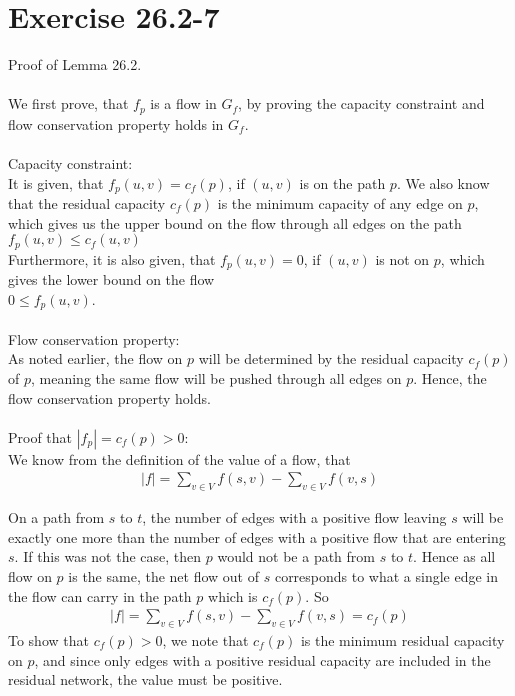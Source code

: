 \section{Exercise 26.2-7}
Proof of Lemma 26.2.
\\
\\
We first prove, that $f_p$ is a flow in $G_f$, by proving the capacity constraint and flow conservation property holds in $G_f$.
\\
\\
Capacity constraint:
\\
It is given, that $f_p(u,v)=c_f(p)$, if $(u,v)$ is on the path $p$. We also know that the residual capacity $c_f(p)$ is the minimum capacity of any edge on $p$, which gives us the upper bound on the flow through all edges on the path
\\
$f_p(u,v)\leq c_f(u,v)$
\\
Furthermore, it is also given, that $f_p(u,v)=0$, if $(u,v)$ is not on $p$, which gives the lower bound on the flow
\\
$0 \leq f_p(u,v)$.
\\
\\
Flow conservation property:
\\
As noted earlier, the flow on $p$ will be determined by the residual capacity $c_f(p)$ of $p$, meaning the same flow will be pushed through all edges on $p$. Hence, the flow conservation property holds.
\\
\\
Proof that $|f_p| = c_f(p)>0$:
\\
We know from the definition of the value of a flow, that 
\begin{align}
|f| = \sum_{v\in V}f(s,v) - \sum_{v\in V}f(v,s)
\end{align}

On a path from $s$ to $t$, the number of edges with a positive flow leaving $s$ will be exactly one more than the number of edges with a positive flow that are entering $s$. If this was not the case, then $p$ would not be a path from $s$ to $t$. Hence as all flow on $p$ is the same, the net flow out of $s$ corresponds to what a single edge in the flow can carry in the path $p$ which is $c_f(p)$. So
\begin{align}
|f| = \sum_{v\in V}f(s,v) - \sum_{v\in V}f(v,s) = c_f(p)
\end{align}
To show that $c_f(p)>0$, we note that $c_f(p)$ is the minimum residual capacity on $p$, and since only edges with a positive residual capacity are included in the residual network, the value must be positive.